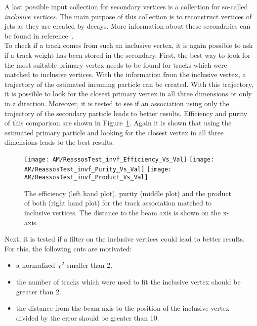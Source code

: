 A last possible input collection for secondary vertices is a collection for so-called \textit{inclusive vertices}. The main purpose of this collection is to reconstruct vertices of jets as they are created by \PB{} decays. More information about these secondaries can be found in reference~. \\
To check if a track comes from such an inclusive vertex, it is again possible to ask if a track weight has been stored in the secondary. First, the best way to look for the most suitable primary vertex needs to be found for tracks which were matched to inclusive vertices. With the information from the inclusive vertex, a trajectory of the estimated incoming particle can be created. With this trajectory, it is possible to look for the closest primary vertex in all three dimensions or only in z direction. Moreover, it is tested to see if an association using only the trajectory of the secondary particle leads to better results. Efficiency and purity of this comparison are shown in Figure~\ref{plot:AMWFSVinvfEffAndPurSO}. Again it is shown that using the estimated primary particle and looking for the closest vertex in all three dimensions leads to the best results. 

\begin{figure}[!ht]
  \centering
  \texttt{[image: AM/ReassosTest\_invf\_Efficiency\_Vs\_Val]}
  \texttt{[image: AM/ReassosTest\_invf\_Purity\_Vs\_Val]}
  \texttt{[image: AM/ReassosTest\_invf\_Product\_Vs\_Val]}
  \caption[Efficiency, purity and their product of the association with inclusive vertices for different search options as a function of distance to the beam axis]{The efficiency (left hand plot), purity (middle plot) and the product of both (right hand plot) for the track association matched to inclusive vertices. The distance to the beam axis is shown on the x-axis.\label{plot:AMWFSVinvfEffAndPurSO}}
\end{figure}

Next, it is tested if a filter on the inclusive vertices could lead to better results. For this, the following cuts are motivated:
\begin{itemize}
\item a normalized $\chi^{2}$ smaller than 2.
\item the number of tracks which were used to fit the inclusive vertex should be greater than 2.
\item the distance from the beam axis to the position of the inclusive vertex divided by the error should be greater than 10.
\end{itemize}

